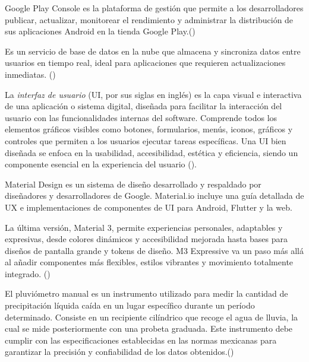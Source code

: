 \begin{definition}
  Google Play Console es la plataforma de gestión que permite a los desarrolladores publicar, actualizar, monitorear el rendimiento y administrar la distribución de sus aplicaciones Android en la tienda Google Play.(\cite{googleplayconsole})


\end{definition}

\begin{definition}
Es un servicio de base de datos en la nube que almacena y sincroniza datos entre usuarios en tiempo real, ideal para aplicaciones que requieren actualizaciones inmediatas. (\cite{firebaserealtime})
\end{definition}

\begin{definition}
  La \textit{interfaz de usuario} (UI, por sus siglas en inglés) es la capa visual e interactiva de una aplicación o sistema digital, diseñada para facilitar la interacción del usuario con las funcionalidades internas del software. Comprende todos los elementos gráficos visibles como botones, formularios, menús, iconos, gráficos y controles que permiten a los usuarios ejecutar tareas específicas. Una UI bien diseñada se enfoca en la usabilidad, accesibilidad, estética y eficiencia, siendo un componente esencial en la experiencia del usuario  (\cite{shneiderman}).
\end{definition}



\begin{definition}
Material Design es un sistema de diseño desarrollado y respaldado por diseñadores y desarrolladores de Google. Material.io incluye una guía detallada de UX e implementaciones de componentes de UI para Android, Flutter y la web.

La última versión, Material 3, permite experiencias personales, adaptables y expresivas, desde colores dinámicos y accesibilidad mejorada hasta bases para diseños de pantalla grande y tokens de diseño. M3 Expressive va un paso más allá al añadir componentes más flexibles, estilos vibrantes y movimiento totalmente integrado. (\cite{materialdesign2023})
\end{definition}

\begin{definition}

El pluviómetro manual es un instrumento utilizado para medir la cantidad de precipitación líquida caída en un lugar específico durante un período determinado. Consiste en un recipiente cilíndrico que recoge el agua de lluvia, la cual se mide posteriormente con una probeta graduada. Este instrumento debe cumplir con las especificaciones establecidas en las normas mexicanas para garantizar la precisión y confiabilidad de los datos obtenidos.(\cite{semarnat_pluviometro})
\end{definition}

